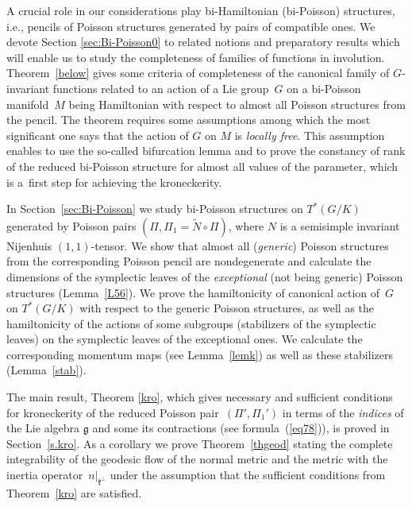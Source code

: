 \documentclass[10pt,a4paper]{amsart}
\numberwithin{equation}{section}
\begin{document}
A crucial role in our considerations play bi-Hamiltonian (bi-Poisson) structures, i.e., pencils of Poisson structures generated by pairs of compatible ones. We devote Section \ref{sec:Bi-Poisson0} to related notions and preparatory results which will enable us to study the completeness of families of functions in involution. Theorem~\ref{below} gives some criteria of completeness of the canonical family of $G$-invariant functions related to an action of a Lie group~$G$ on a bi-Poisson manifold~$M$ being Hamiltonian with respect to almost all Poisson structures from the pencil. The theorem requires some assumptions among which the most significant one says that the action of $G$ on $M$ is \emph{locally free}. This assumption enables to use the so-called bifurcation lemma and to prove the constancy of rank of the reduced bi-Poisson structure for almost all values of the parameter, which is a~first step for achieving the kroneckerity.

In Section~\ref{sec:Bi-Poisson} we study bi-Poisson structures on $T^*(G/K)$ generated by Poisson pairs $(\Pi,\Pi_1=\widetilde{N}\circ\Pi)$, where $N$ is a semisimple invariant Nijenhuis $(1,1)$-tensor. We show that almost all (\emph{generic}) Poisson structures from the corresponding Poisson pencil are nondegenerate and calculate the dimensions of the symplectic leaves of the\emph{ exceptional} (not being generic) Poisson structures (Lemma~\ref{L56}). We prove the hamiltonicity of canonical action of~$G$ on $T^*(G/K)$ with respect to the generic Poisson structures, as well as the hamiltonicity of the actions of some subgroups (stabilizers of the symplectic leaves) on the symplectic leaves of the exceptional ones. We calculate the corresponding momentum maps (see Lemma~\ref{lemk}) as well as these stabilizers (Lemma~\ref{stab}).

The main result, Theorem \ref{kro}, which gives necessary and sufficient conditions for kroneckerity of the reduced Poisson pair~$(\Pi',\Pi_1')$ in terms of the \emph{indices} of the Lie algebra $\mathfrak{g}$ and some its contractions (see formula~(\ref{eq78})), is proved in Section~\ref{s.kro}. As a corollary we prove Theorem~\ref{thgeod} stating the complete integrability of the geodesic flow of the normal metric and the metric with the inertia operator~$n|_{\mathfrak{k}^\perp}$ under the assumption that the sufficient conditions from Theorem~\ref{kro} are satisfied.
\end{document}
